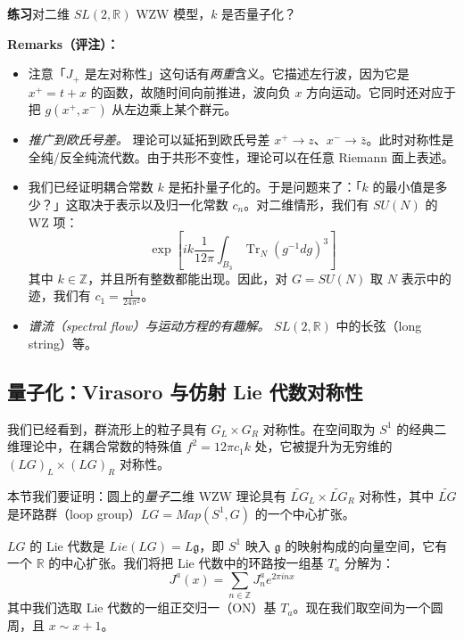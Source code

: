 \medskip
\noindent\textbf{练习}\quad 对二维 $SL(2,\mathbb{R})$ WZW 模型，$k$ 是否量子化？

\medskip
\noindent\textbf{Remarks（评注）：}

\begin{itemize}
  \item 注意「$J_+$ 是左对称性」这句话有\emph{两重}含义。它描述左行波，因为它是 $x^+=t+x$ 的函数，故随时间向前推进，波向负 $x$ 方向运动。它同时还对应于把 $g(x^+,x^-)$ 从左边乘上某个群元。
  \item \emph{推广到欧氏号差。} 理论可以延拓到欧氏号差 $x^+\to z$、$x^-\to\bar z$。此时对称性是全纯/反全纯流代数。由于共形不变性，理论可以在任意 Riemann 面上表述。
  \item 我们已经证明耦合常数 $k$ 是拓扑量子化的。于是问题来了：「$k$ 的最小值是多少？」这取决于表示以及归一化常数 $c_n$。对二维情形，我们有 $SU(N)$ 的 WZ 项：
  \begin{equation}
    \exp\left[ik\frac{1}{12\pi}\int_{B_3}\operatorname{Tr}_N\left(g^{-1}dg\right)^3\right]
    \tag{4.50}
    \label{eq:4.50}
  \end{equation}
  其中 $k\in\mathbb{Z}$，并且所有整数都能出现。因此，对 $G=SU(N)$ 取 $N$ 表示中的迹，我们有 $c_1=\frac{1}{24\pi^2}$。
  \item \emph{谱流（spectral flow）与运动方程的有趣解。} $SL(2,\mathbb{R})$ 中的长弦（long string）等。
\end{itemize}

\subsection{量子化：Virasoro 与仿射 Lie 代数对称性} %

我们已经看到，群流形上的粒子具有 $G_L\times G_R$ 对称性。在空间取为 $S^1$ 的经典二维理论中，在耦合常数的特殊值 $f^2=12\pi c_1k$ 处，它被提升为无穷维的 $(LG)_L\times(LG)_R$ 对称性。

本节我们要证明：圆上的\emph{量子}二维 WZW 理论具有 $\widetilde{LG}_L\times\widetilde{LG}_R$ 对称性，其中 $\widetilde{LG}$ 是环路群（loop group）$LG=Map(S^1,G)$ 的一个中心扩张。

$LG$ 的 Lie 代数是 $Lie(LG)=L\mathfrak{g}$，即 $S^1$ 映入 $\mathfrak{g}$ 的映射构成的向量空间，它有一个 $\mathbb{R}$ 的中心扩张。我们将把 Lie 代数中的环路按一组基 $T_a$ 分解为：
\begin{equation}
  J^a(x) = \sum_{n\in\mathbb{Z}}J^a_n e^{2\pi i n x}
  \tag{4.51}
  \label{eq:4.51}
\end{equation}
其中我们选取 Lie 代数的一组正交归一（ON）基 $T_a$。现在我们取空间为一个圆周，且 $x\sim x+1$。

